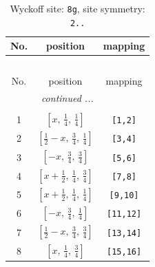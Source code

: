 \documentclass[fleqn,8pt]{jsarticle}
\begin{document}
\begin{longtable}{ccc}
\caption{Wyckoff site: {\tt 8g}, site symmetry: {\tt 2..}}
 \\
 \hline \hline
No. & position & mapping \\ \hline \endfirsthead

\multicolumn{2}{l}{\tablename\ \thetable{}} \\
 \hline \hline
No. & position & mapping \\ \hline \endhead

 \hline \hline
\multicolumn{2}{r}{\footnotesize\it continued ...} \\ \endfoot

 \hline \hline
\multicolumn{2}{r}{} \\ \endlastfoot

1 & $\left[ x,\, \frac{1}{4},\, \frac{1}{4} \right]$ & {\tt [1,2]} \\ \hline
2 & $\left[ \frac{1}{2} - x,\, \frac{3}{4},\, \frac{1}{4} \right]$ & {\tt [3,4]} \\ \hline
3 & $\left[ - x,\, \frac{3}{4},\, \frac{3}{4} \right]$ & {\tt [5,6]} \\ \hline
4 & $\left[ x + \frac{1}{2},\, \frac{1}{4},\, \frac{3}{4} \right]$ & {\tt [7,8]} \\ \hline
5 & $\left[ x + \frac{1}{2},\, \frac{1}{4},\, \frac{1}{4} \right]$ & {\tt [9,10]} \\ \hline
6 & $\left[ - x,\, \frac{3}{4},\, \frac{1}{4} \right]$ & {\tt [11,12]} \\ \hline
7 & $\left[ \frac{1}{2} - x,\, \frac{3}{4},\, \frac{3}{4} \right]$ & {\tt [13,14]} \\ \hline
8 & $\left[ x,\, \frac{1}{4},\, \frac{3}{4} \right]$ & {\tt [15,16]} \\
\end{longtable}
\renewcommand{\arraystretch}{1.2}
\end{document}
